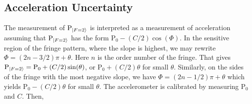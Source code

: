\subsection{Acceleration Uncertainty}\label{subsec:accel_uncert}
The measurement of $\text{P}_{\ket{F=2}}$ is interpreted as a
measurement of acceleration assuming that $\text{P}_{\ket{F=2}}$ has
the form $\text{P}_0 - (C/2)\cos(\Phi)$. In the sensitive region of
the fringe pattern, where the slope is highest, we may rewrite $\Phi =
(2n - 3/2)\pi + \theta$. Here $n$ is the order number of the fringe.
That gives $\text{P}_{\ket{F=2}} = \text{P}_0 + (C/2) \sin(\theta)$,
or $\text{P}_0 + (C/2)\theta$ for small $\theta$. Similarly, on the sides of the fringe
with the most negative slope, we have $\Phi = (2n-1/2)\pi + \theta$ which
yields $\text{P}_0 - (C/2)\theta$ for small $\theta$. The
accelerometer is calibrated by measuring $\text{P}_0$ and $C$. Then,
